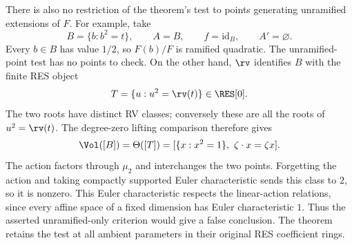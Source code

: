 There is also no restriction of the theorem's test to points
generating unramified extensions of $F$.
For example, take
\[
 B=\{b:b^2=t\},\qquad A=B,\qquad f=\mathrm{id}_B,
 \qquad A'=\varnothing.
\]
Every $b\in B$ has value $1/2$, so $F(b)/F$ is ramified
quadratic. The unramified-point test has no points to check.
On the other hand, $\rv$ identifies $B$ with the finite
RES object
\[
 T=\{u:u^2=\rv(t)\}\in\RES[0].
\]
The two roots have distinct RV classes; conversely these are
all the roots of $u^2=\rv(t)$.
The degree-zero lifting comparison therefore gives
\[
 \Vol([B])=\Theta([T])
   =[\{x:x^2=1\},\ \zeta\cdot x=\zeta x].
\]
The action factors through $\mu_2$ and interchanges the two
points. Forgetting the action and taking compactly supported
Euler characteristic sends this class to $2$, so it is
nonzero. This Euler characteristic respects the linear-action
relations, since every affine space of a fixed dimension has
Euler characteristic $1$.
Thus the asserted unramified-only criterion would give a
false conclusion. The theorem retains the test at all
ambient parameters in their original RES coefficient rings.
